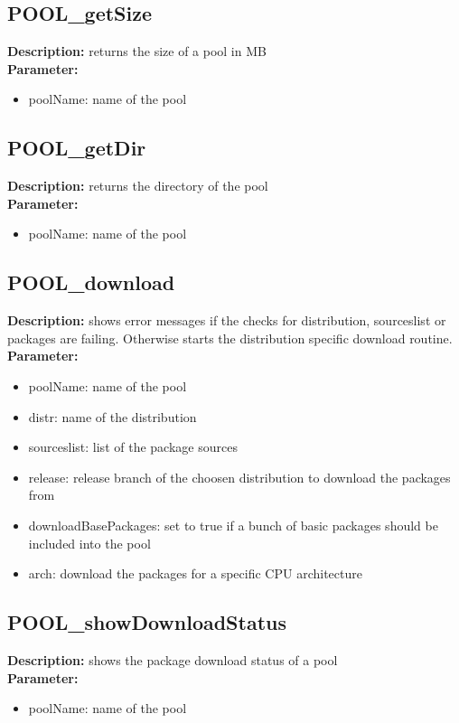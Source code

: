 \subsection{POOL\_getSize}
\textbf{Description:} returns the size of a pool in MB\\
\textbf{Parameter:}
\begin{itemize}
\item poolName: name of the pool
\end{itemize}

\subsection{POOL\_getDir}
\textbf{Description:} returns the directory of the pool\\
\textbf{Parameter:}
\begin{itemize}
\item poolName: name of the pool
\end{itemize}

\subsection{POOL\_download}
\textbf{Description:} shows error messages if the checks for distribution, sourceslist or packages are failing. Otherwise starts the distribution specific download routine.\\
\textbf{Parameter:}
\begin{itemize}
\item poolName: name of the pool
\item distr: name of the distribution
\item sourceslist: list of the package sources
\item release: release branch of the choosen distribution to download the packages from
\item downloadBasePackages: set to true if a bunch of basic packages should be included into the pool
\item arch: download the packages for a specific CPU architecture
\end{itemize}

\subsection{POOL\_showDownloadStatus}
\textbf{Description:} shows the package download status of a pool\\
\textbf{Parameter:}
\begin{itemize}
\item poolName: name of the pool
\end{itemize}

